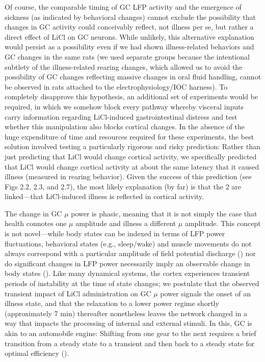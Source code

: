 \begin{refsection}
Of course, the comparable timing of GC LFP activity and the emergence of sickness (as indicated by behavioral changes) cannot exclude the possibility that changes in GC activity could conceivably reflect, not illness per se, but rather a direct effect of LiCl on GC neurons. While unlikely, this alternative explanation would persist as a possibility even if we had shown illness-related behaviors and GC changes in the same rats (we used separate groups because the intentional subtlety of the illness-related rearing changes, which allowed us to avoid the possibility of GC changes reflecting massive changes in oral fluid handling, cannot be observed in rats attached to the electrophysiology/IOC harness). To completely disapprove this hypothesis, an additional set of experiments would be required, in which we somehow block every pathway whereby visceral inputs carry information regarding LiCl-induced gastrointestinal distress and test whether this manipulation also blocks cortical changes. In the absence of the huge expenditure of time and resources required for these experiments, the best solution involved testing a particularly rigorous and risky prediction: Rather than just predicting that LiCl would change cortical activity, we specifically predicted that LiCl would change cortical activity at about the same latency that it caused illness (measured in rearing behavior). Given the success of this prediction (see Figs 2.2, 2.3, and 2.7), the most likely explanation (by far) is that the 2 are linked—that LiCl-induced illness is reflected in cortical activity.

The change in GC \(\mu\) power is phasic, meaning that it is not simply the case that health connotes one \(\mu\) amplitude and illness a different \(\mu\) amplitude. This concept is not novel—while body states can be indexed in terms of LFP power fluctuations, behavioral states (e.g., sleep/wake) and muscle movements do not always correspond with a particular amplitude of field potential discharge (\cite{aston-jones1981a}) nor do significant changes in LFP power necessarily imply an observable change in body states (\cite{rojas-l2014a}). Like many dynamical systems, the cortex experiences transient periods of instability at the time of state changes; we postulate that the observed transient impact of LiCl administration on GC \(\mu\) power signals the onset of an illness state, and that the relaxation to a lower power regime shortly (approximately 7 min) thereafter nonetheless leaves the network changed in a way that impacts the processing of internal and external stimuli. In this, GC is akin to an automobile engine: Shifting from one gear to the next requires a brief transition from a steady state to a transient and then back to a steady state for optimal efficiency (\cite{oglieve2017a,horn2006a}).


\end{refsection}
